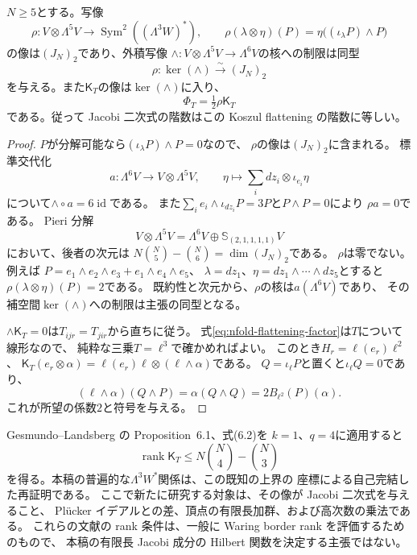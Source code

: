 \begin{lemma}
\label{lem:nfold-koszul-flattening}
$N\ge5$とする。写像
\[
 \rho:V\otimes\Lambda^5V\longrightarrow
       \operatorname{Sym}^2((\Lambda^3W)^*),
 \qquad
 \rho(\lambda\otimes\eta)(P)
       =\eta\bigl((\iota_\lambda P)\wedge P\bigr)
\]
の像は$(J_N)_2$であり、外積写像
$\wedge:V\otimes\Lambda^5V\to\Lambda^6V$の核への制限は同型
\[
 \rho:\ker(\wedge)\xrightarrow{\sim}(J_N)_2
\]
を与える。また$\mathsf K_T$の像は$\ker(\wedge)$に入り、
\begin{equation}\label{eq:nfold-flattening-factor}
 \Phi_T=\tfrac12\rho\mathsf K_T
\end{equation}
である。従って Jacobi 二次式の階数はこの Koszul flattening の階数に等しい。
\end{lemma}
\begin{proof}
$P$が分解可能なら$(\iota_\lambda P)\wedge P=0$なので、
$\rho$の像は$(J_N)_2$に含まれる。
標準交代化
\[
 a:\Lambda^6V\longrightarrow V\otimes\Lambda^5V,
 \qquad \eta\longmapsto\sum_i dz_i\otimes\iota_{e_i}\eta
\]
について$\wedge\circ a=6\operatorname{id}$である。
また$\sum_i e_i\wedge\iota_{dz_i}P=3P$と$P\wedge P=0$により
$\rho a=0$である。
Pieri 分解
\[
 V\otimes\Lambda^5V
   =\Lambda^6V\oplus\mathbb S_{(2,1,1,1,1)}V
\]
において、後者の次元は
$N\binom N5-\binom N6=\dim(J_N)_2$である。
$\rho$は零でない。例えば
$P=e_1\wedge e_2\wedge e_3+e_1\wedge e_4\wedge e_5$、
$\lambda=dz_1$、$\eta=dz_1\wedge\cdots\wedge dz_5$とすると
$\rho(\lambda\otimes\eta)(P)=2$である。
既約性と次元から、$\rho$の核は$a(\Lambda^6V)$であり、
その補空間$\ker(\wedge)$への制限は主張の同型となる。

$\wedge\mathsf K_T=0$は$T_{ijr}=T_{jir}$から直ちに従う。
式\eqref{eq:nfold-flattening-factor}は$T$について線形なので、
純粋な三乗$T=\ell^3$で確かめればよい。
このとき$H_r=\ell(e_r)\ell^2$、
$\mathsf K_T(e_r\otimes\alpha)
 =\ell(e_r)\ell\otimes(\ell\wedge\alpha)$である。
$Q=\iota_\ell P$と置くと$\iota_\ell Q=0$であり、
\[
 (\ell\wedge\alpha)(Q\wedge P)
   =\alpha(Q\wedge Q)=2 B_{\ell^2}(P)(\alpha).
\]
これが所望の係数$2$と符号を与える。
\end{proof}

\begin{remark}[既知の階数上界との関係]
Gesmundo--Landsberg の Proposition~6.1、式(6.2)を
$k=1$、$q=4$に適用すると
\[
 \operatorname{rank}\mathsf K_T
 \le N\binom N4-\binom N3
\]
を得る。本稿の普遍的な$\Lambda^3W^*$関係は、この既知の上界の
座標による自己完結した再証明である。
ここで新たに研究する対象は、その像が Jacobi 二次式を与えること、
Pl\"ucker イデアルとの差、頂点の有限長加群、および高次数の乗法である。
これらの文献の rank 条件は、一般に Waring border rank を評価するためのもので、
本稿の有限長 Jacobi 成分の Hilbert 関数を決定する主張ではない。
\end{remark}


